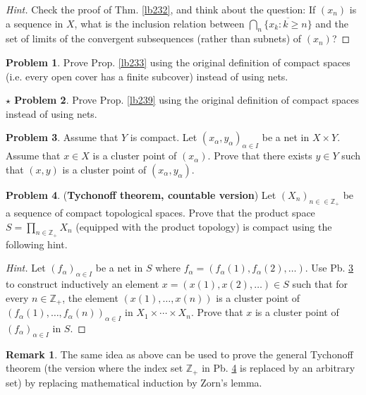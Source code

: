 \documentclass[12pt,b5paper,notitlepage]{article}
\theoremstyle{definition}
\newtheorem{rem}[df]{Remark}
\newtheorem{prob}{\color{red}Problem}[section]
\newtheorem{sprob}[prob]{\color{red}$\star$ Problem}
\theoremstyle{plain}
\newcommand{\ovl}{\overline}
\newcommand{\Zbb}{\mathbb Z}
\numberwithin{equation}{section}
\begin{document}
\begin{proof}[Hint]
Check the proof of Thm. \ref{lb232}, and think about the question: If $(x_n)$ is a sequence in $X$, what is the inclusion relation between $\bigcap_n\ovl{\{x_k:k\geq n\}}$ and the set of limits of the convergent subsequences (rather than subnets) of $(x_n)$?
\end{proof}







\begin{prob}\label{lb246}
Prove Prop. \ref{lb233} using the original definition of compact spaces (i.e. every open cover has a finite subcover) instead of using nets.
\end{prob}

\begin{sprob}
Prove Prop. \ref{lb239} using the original definition of compact spaces instead of using nets.
\end{sprob}

\begin{prob}\label{lb240}
Assume that $Y$ is compact. Let $(x_\alpha,y_\alpha)_{\alpha\in I}$ be a net in $X\times Y$. Assume that $x\in X$ is a cluster point of $(x_\alpha)$. Prove that there exists $y\in Y$ such that $(x,y)$ is a cluster point of $(x_\alpha,y_\alpha)$.
\end{prob}

\begin{prob} \label{lb241}
(\textbf{Tychonoff theorem, countable version}) Let $(X_n)_{n\in\in\Zbb_+}$ be a sequence of compact topological spaces. Prove that the product space $S=\prod_{n\in\Zbb_+}X_n$ (equipped with the product topology) is compact using the following hint.
\end{prob}

\begin{proof}[Hint]
Let $(f_\alpha)_{\alpha\in I}$ be a net in $S$ where $f_\alpha=(f_\alpha(1),f_\alpha(2),\dots)$. Use Pb. \ref{lb240} to construct inductively an element $x=(x(1),x(2),\dots)\in S$ such that for every $n\in\Zbb_+$, the element $(x(1),\dots,x(n))$ is a cluster point of $(f_\alpha(1),\dots,f_\alpha(n))_{\alpha\in I}$ in $X_1\times\cdots\times X_n$. Prove that $x$ is a cluster point of $(f_\alpha)_{\alpha\in I}$ in $S$.
\end{proof}


\begin{rem}
The same idea as above can be used to prove the general Tychonoff theorem (the version where the index set $\Zbb_+$ in Pb. \ref{lb241} is replaced by an arbitrary set) by replacing mathematical induction by Zorn's lemma. 
\end{rem}
\end{document}
